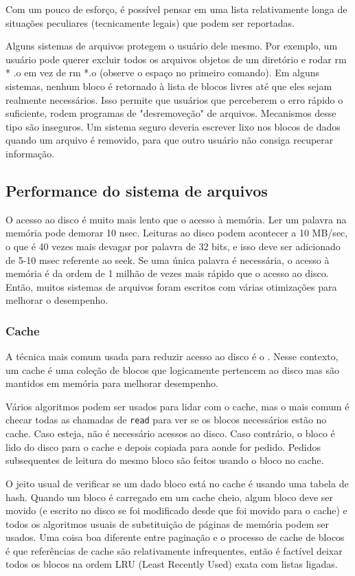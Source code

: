 \documentclass{article}
\begin{document}
Com um pouco de esforço, é possível pensar em uma lista relativamente longa de situações peculiares (tecnicamente legais) que podem ser reportadas.

Alguns sistemas de arquivos protegem o usuário dele mesmo. Por exemplo, um usuário pode querer excluir todos os arquivos objetos de um diretório e rodar rm * .o em vez de rm *.o (observe o espaço no primeiro comando). Em alguns sistemas, nenhum bloco é retornado à lista de blocos livres até que eles sejam realmente necessários. Isso permite que usuários que perceberem o erro rápido o suficiente, rodem programas de "desremoveção" de arquivos. Mecanismos desse tipo são inseguros. Um sistema seguro deveria escrever lixo nos blocos de dados quando um arquivo é removido, para que outro usuário não consiga recuperar informação.

\subsection{Performance do sistema de arquivos}
O acesso ao disco é muito mais lento que o acesso à memória. Ler um palavra na memória pode demorar 10 nsec. Leituras ao disco podem acontecer a 10 MB/sec, o que é 40 vezes mais devagar por palavra de 32 bits, e isso deve ser adicionado de 5-10 msec referente ao seek. Se uma única palavra é necessária, o acesso à memória é da ordem de 1 milhão de vezes mais rápido que o acesso ao disco. Então, muitos sistemas de arquivos foram escritos com várias otimizações para melhorar o desempenho.

\subsubsection{Cache}

A técnica mais comum usada para reduzir acesso ao disco é o . Nesse contexto, um cache é uma coleção de blocos que logicamente pertencem ao disco mas são mantidos em memória para melhorar desempenho.

Vários algoritmos podem ser usados para lidar com o cache, mas o mais comum é checar todas as chamadas de \verb|read| para ver se os blocos necessários estão no cache. Caso esteja, não é necessário acessos ao disco. Caso contrário, o bloco é lido do disco para o cache e depois copiada para aonde for pedido. Pedidos subsequentes de leitura do mesmo bloco são feitos usando o bloco no cache.

O jeito usual de verificar se um dado bloco está no cache é usando uma tabela de hash. Quando um bloco é carregado em um cache cheio, algum bloco deve ser movido (e escrito no disco se foi modificado desde que foi movido para o cache) e todos os algoritmos usuais de substituição de páginas de memória podem ser usados. Uma coisa boa diferente entre paginação e o processo de cache de blocos é que referências de cache são relativamente infrequentes, então é factível deixar todos os blocos na ordem LRU (Least Recently Used) exata com listas ligadas.
\end{document}
